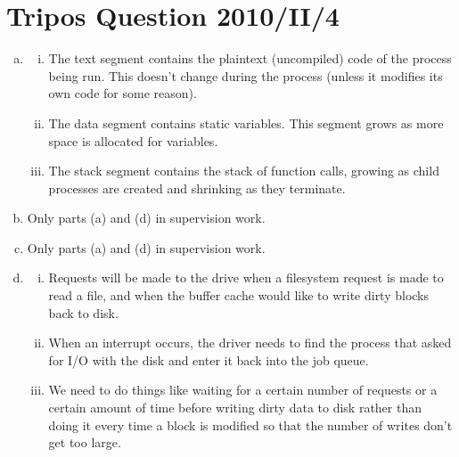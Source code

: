 \documentclass[12pt]{article}
\begin{document}
\section*{Tripos Question 2010/II/4}
\begin{enumerate}[(a)]
    \item \begin{enumerate}[(i)]
        \item The text segment contains the plaintext (uncompiled) code of the process being run. This doesn't change during the process (unless it modifies its own code for some reason).
        \item The data segment contains static variables. This segment grows as more space is allocated for variables.
        \item The stack segment contains the stack of function calls, growing as child processes are created and shrinking as they terminate.
    \end{enumerate}
    \item Only parts (a) and (d) in supervision work.
    \item Only parts (a) and (d) in supervision work.
    \item \begin{enumerate}[(i)]
        \item Requests will be made to the drive when a filesystem request is made to read a file, and when the buffer cache would like to write dirty blocks back to disk.
        \item When an interrupt occurs, the driver needs to find the process that asked for I/O with the disk and enter it back into the job queue.
        \item We need to do things like waiting for a certain number of requests or a certain amount of time before writing dirty data to disk rather than doing it every time a block is modified so that the number of writes don't get too large.
    \end{enumerate}
\end{enumerate}
\end{document}
